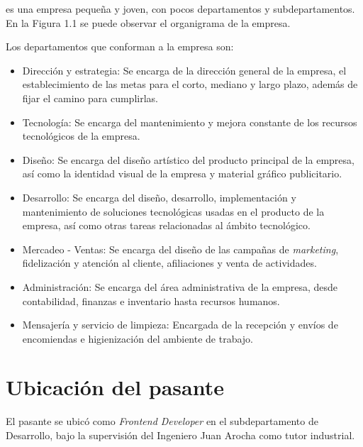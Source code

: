 \business es una empresa pequeña y joven, con pocos departamentos y subdepartamentos. En la Figura 1.1 se puede observar el organigrama de la empresa.


Los departamentos que conforman a la empresa son:

\begin{itemize}
  \item Dirección y estrategia: Se encarga de la dirección general de la empresa, el establecimiento de las metas para el corto, mediano y largo plazo, además de fijar el camino para cumplirlas.
  \item Tecnología: Se encarga del mantenimiento y mejora constante de los recursos tecnológicos de la empresa.
  \item Diseño: Se encarga del diseño artístico del producto principal de la empresa, así como la identidad visual de la empresa y material gráfico publicitario.
  \item Desarrollo: Se encarga del diseño, desarrollo, implementación y mantenimiento de soluciones tecnológicas usadas en el producto de la empresa, así como otras tareas relacionadas al ámbito tecnológico.
  \item Mercadeo - Ventas: Se encarga del diseño de las campañas de \textit{marketing}, fidelización y atención al cliente, afiliaciones y venta de actividades.
  \item Administración: Se encarga del área administrativa de la empresa, desde contabilidad, finanzas e inventario hasta recursos humanos.
  \item Mensajería y servicio de limpieza: Encargada de la recepción y envíos de encomiendas e higienización del ambiente de trabajo.
\end{itemize}

\section{Ubicación del pasante}

El pasante se ubicó como \textit{Frontend Developer} en el subdepartamento de Desarrollo, bajo la supervisión del Ingeniero Juan Arocha como tutor industrial.

